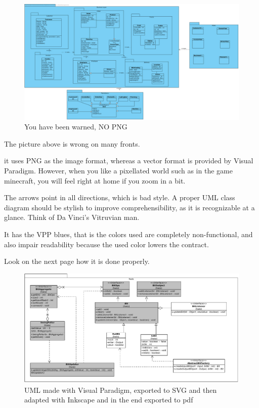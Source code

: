 \begin{figure}[htbp]
  \includegraphics[width=\linewidth]{images/ClassDiagram1.png}
  \caption{You have been warned, NO PNG}
\end{figure}

The picture above is wrong on many fronts.
\begin{Itemize}
\item it uses PNG as the image format, whereas a vector format is provided by Visual Paradigm.
However, when you like a pixellated world such as in the game \gls{minecraft}, you will feel right at home if you zoom in a bit.
\item The arrows point in all directions, which is bad style. A proper UML class diagram should be stylish to improve comprehensibility, as it is recognizable at a glance. Think of Da Vinci's Vitruvian man.
\item It has the VPP blues, that is the colors used are completely non-functional, and also impair readability because the used color lowers the contract.
\end{Itemize}

Look on the next page how it is done properly.

\begin{figure}
  \includegraphics[width=\linewidth]{images/HWIO.pdf}
	\caption{UML made with Visual Paradigm, exported to SVG and then adapted with Inkscape and in the end exported to pdf}
\end{figure}


